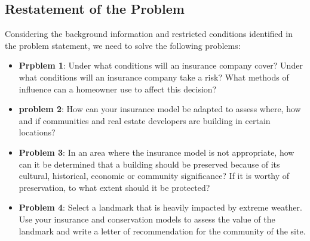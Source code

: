 \documentclass{mcmthesis}
\begin{document}
\subsection{Restatement of the Problem}
Considering the background information and restricted conditions 
identified in the problem statement, we need to solve the following
problems:
\begin{itemize}
	\item 
	\textbf{Prpblem 1}: Under what conditions will an insurance company cover? Under what conditions will an insurance company take a risk? What methods of influence can a homeowner use to affect this decision?
	\item 
	\textbf{problem 2}: How can your insurance model be adapted to assess where, how and if communities and real estate developers are building in certain locations?
	\item 
    \textbf{Problem 3}: In an area where the insurance model is not appropriate, how can it be determined that a building should be preserved because of its cultural, historical, economic or community significance? If it is worthy of preservation, to what extent should it be protected?
	\item 
	\textbf{Problem 4}: Select a landmark that is heavily impacted by extreme weather. Use your insurance and conservation models to assess the value of the landmark and write a letter of recommendation for the community of the site.
\end{itemize}
\end{document}
